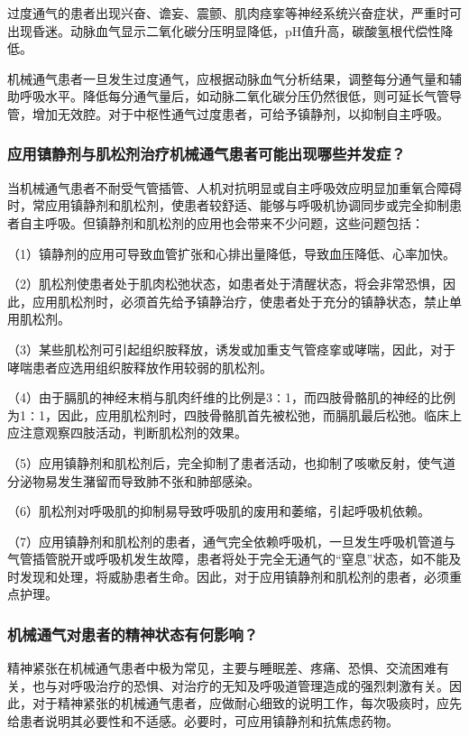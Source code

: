 过度通气的患者出现兴奋、谵妄、震颤、肌肉痉挛等神经系统兴奋症状，严重时可出现昏迷。动脉血气显示二氧化碳分压明显降低，pH值升高，碳酸氢根代偿性降低。

机械通气患者一旦发生过度通气，应根据动脉血气分析结果，调整每分通气量和辅助呼吸水平。降低每分通气量后，如动脉二氧化碳分压仍然很低，则可延长气管导管，增加无效腔。对于中枢性通气过度患者，可给予镇静剂，以抑制自主呼吸。

\subsubsection{应用镇静剂与肌松剂治疗机械通气患者可能出现哪些并发症？}

当机械通气患者不耐受气管插管、人机对抗明显或自主呼吸效应明显加重氧合障碍时，常应用镇静剂和肌松剂，使患者较舒适、能够与呼吸机协调同步或完全抑制患者自主呼吸。但镇静剂和肌松剂的应用也会带来不少问题，这些问题包括：

（1）镇静剂的应用可导致血管扩张和心排出量降低，导致血压降低、心率加快。

（2）肌松剂使患者处于肌肉松弛状态，如患者处于清醒状态，将会非常恐惧，因此，应用肌松剂时，必须首先给予镇静治疗，使患者处于充分的镇静状态，禁止单用肌松剂。

（3）某些肌松剂可引起组织胺释放，诱发或加重支气管痉挛或哮喘，因此，对于哮喘患者应选用组织胺释放作用较弱的肌松剂。

（4）由于膈肌的神经末梢与肌肉纤维的比例是3∶1，而四肢骨骼肌的神经的比例为1∶1，因此，应用肌松剂时，四肢骨骼肌首先被松弛，而膈肌最后松弛。临床上应注意观察四肢活动，判断肌松剂的效果。

（5）应用镇静剂和肌松剂后，完全抑制了患者活动，也抑制了咳嗽反射，使气道分泌物易发生潴留而导致肺不张和肺部感染。

（6）肌松剂对呼吸肌的抑制易导致呼吸肌的废用和萎缩，引起呼吸机依赖。

（7）应用镇静剂和肌松剂的患者，通气完全依赖呼吸机，一旦发生呼吸机管道与气管插管脱开或呼吸机发生故障，患者将处于完全无通气的“窒息”状态，如不能及时发现和处理，将威胁患者生命。因此，对于应用镇静剂和肌松剂的患者，必须重点护理。

\subsubsection{机械通气对患者的精神状态有何影响？}

精神紧张在机械通气患者中极为常见，主要与睡眠差、疼痛、恐惧、交流困难有关，也与对呼吸治疗的恐惧、对治疗的无知及呼吸道管理造成的强烈刺激有关。因此，对于精神紧张的机械通气患者，应做耐心细致的说明工作，每次吸痰时，应先给患者说明其必要性和不适感。必要时，可应用镇静剂和抗焦虑药物。

